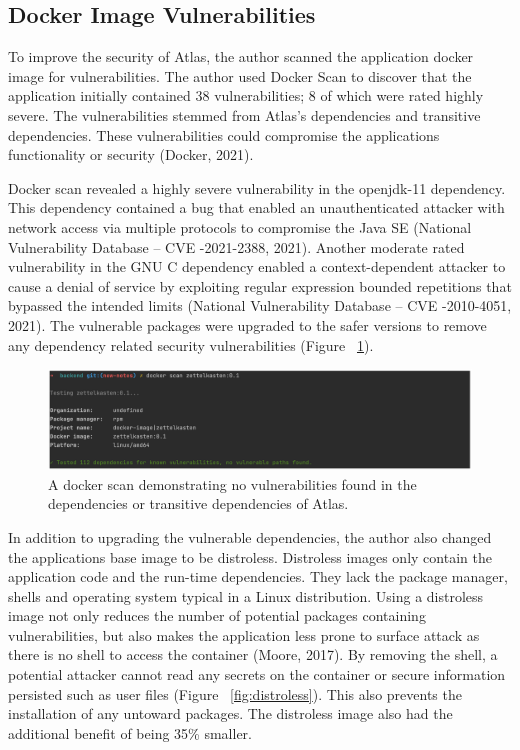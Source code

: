 \documentclass{article}
\begin{document}
\subsection{Docker Image Vulnerabilities}

To improve the security of Atlas, the author scanned the application docker image for vulnerabilities. The author used Docker Scan to discover that the application initially contained 38 vulnerabilities; 8 of which were rated highly severe. The vulnerabilities stemmed from Atlas’s dependencies and transitive dependencies. These vulnerabilities could compromise the applications functionality or security (Docker, 2021). 

Docker scan revealed a highly severe vulnerability in the openjdk-11 dependency. This dependency contained a bug that enabled an unauthenticated attacker with network access via multiple protocols to compromise the Java SE (National Vulnerability Database – CVE -2021-2388, 2021). Another moderate rated vulnerability in the GNU C dependency enabled a context-dependent attacker to cause a denial of service by exploiting regular expression bounded repetitions that bypassed the intended limits (National Vulnerability Database – CVE -2010-4051, 2021). The vulnerable packages were upgraded to the safer versions to remove any dependency related security vulnerabilities (Figure ~\ref{fig:dockerscan}).

\begin{figure}[!h]
  \centering
      \includegraphics[width=1\textwidth]{images/vulnerabilities.png}
  \caption{A docker scan demonstrating no vulnerabilities found in the dependencies or transitive dependencies of Atlas.}
  \label{fig:dockerscan}
\end{figure}

In addition to upgrading the vulnerable dependencies, the author also changed the applications base image to be distroless. Distroless images only contain the application code and the run-time dependencies. They lack the package manager, shells and operating system typical in a Linux distribution. Using a distroless image not only reduces the number of potential packages containing vulnerabilities, but also makes the application less prone to surface attack as there is no shell to access the container (Moore, 2017). By removing the shell, a potential attacker cannot read any secrets on the container or secure information persisted such as user files (Figure ~\ref{fig:distroless}). This also prevents the installation of any untoward packages. The distroless image also had the additional benefit of being 35\% smaller.
\end{document}
